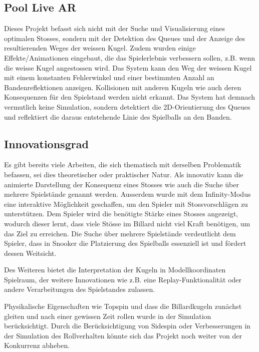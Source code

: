 \subsection{Pool Live AR}
Dieses Projekt befasst sich nicht mit der Suche und Visualisierung eines optimalen Stosses, sondern mit der
Detektion des Queues und der Anzeige des resultierenden Weges der weissen Kugel\cite{poollivear}. Zudem wurden einige
Effekte/Animationen eingebaut, die das Spielerlebnis verbessern sollen, z.B. wenn die weisse Kugel angestossen wird.
Das System kann den Weg der weissen Kugel mit einem konstanten Fehlerwinkel und einer bestimmten Anzahl an
Bandenreflektionen anzeigen.
Kollisionen mit anderen Kugeln wie auch deren Konsequenzen für den Spielstand werden nicht erkannt.
Das System hat demnach vermutlich keine Simulation, sondern detektiert die 2D-Orientierung des Queues und reflektiert die
daraus entstehende Linie des Spielballs an den Banden.

\subsection{Innovationsgrad}
Es gibt bereits viele Arbeiten, die sich thematisch mit derselben Problematik befassen, sei dies theoretischer oder
praktischer Natur.
Als innovativ kann die animierte Darstellung der Konsequenz eines Stosses wie auch die Suche über
mehrere Spielstände genannt werden.
Ausserdem wurde mit dem Infinity-Modus eine interaktive Möglichkeit geschaffen, um den Spieler mit Stossvorschlägen zu unterstützen.
Dem Spieler wird die benötigte Stärke eines Stosses angezeigt, wodurch dieser lernt, dass viele Stösse im Billard nicht viel
Kraft benötigen, um das Ziel zu erreichen.
Die Suche über mehrere Spielstände verdeutlicht dem Spieler, dass in Snooker die Platzierung des Spielballs essenziell ist
und fördert dessen Weitsicht.

Des Weiteren bietet die Interpretation der Kugeln in Modellkoordinaten Spielraum,
der weitere Innovationen wie z.B. eine Replay-Funktionalität oder andere Verarbeitungen des Spielstandes zulassen.

Physikalische Eigenschaften wie Topspin und dass die Billardkugeln zunächst gleiten und nach einer gewissen Zeit rollen
wurde in der Simulation berücksichtigt.
Durch die Berücksichtigung von Sidespin oder Verbesserungen in der Simulation des Rollverhalten könnte sich das
Projekt noch weiter von der Konkurrenz abheben.
